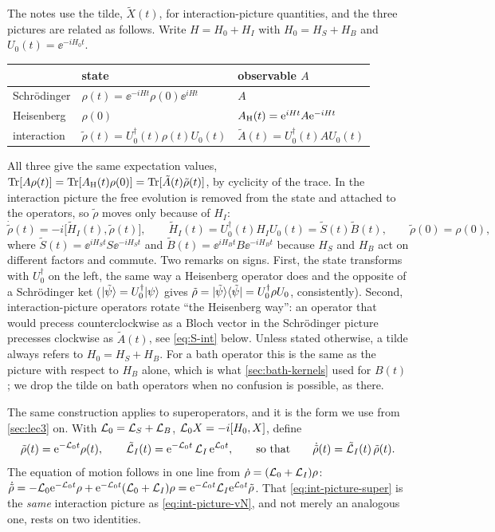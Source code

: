 The notes use the tilde, $\tilde X(t)$, for interaction-picture quantities, and the three pictures are related as follows.
Write $H=H_0+H_I$ with $H_0=H_S+H_B$ and $U_0(t)=\ee^{-iH_0t}$.
\begin{center}
\begin{tabular}{lll}
\toprule
 & state & observable $A$\\
\midrule
Schr\"odinger & $\rho(t)=\ee^{-iHt}\rho(0)\ee^{iHt}$ & $A$\\
Heisenberg & $\rho(0)$ & $A_{\rm H}(t)=\mathrm{e}^{iHt}A\mathrm{e}^{-iHt}$\\
interaction & $\tilde\rho(t)=U_0^\dagger(t)\rho(t)U_0(t)$ & $\tilde A(t)=U_0^\dagger(t)AU_0(t)$\\
\bottomrule
\end{tabular}
\end{center}
All three give the same expectation values, $\operatorname{Tr}[A\rho(t)]=\operatorname{Tr}[A_{\rm H}(t)\rho(0)]=\operatorname{Tr}[\tilde A(t)\tilde\rho(t)]$, by cyclicity of the trace.
In the interaction picture the free evolution is removed from the state and attached to the operators, so $\tilde\rho$ moves only because of $H_I$:
\begin{equation}
  \dot{\tilde\rho}(t)=-i\big[\tilde H_I(t),\tilde\rho(t)\big],\qquad
  \tilde H_I(t)=U_0^\dagger(t)H_IU_0(t)=\tilde S(t)\tilde B(t),\qquad \tilde\rho(0)=\rho(0),
  \label{eq:int-picture-vN}
\end{equation}
where $\tilde S(t)=\ee^{iH_St}S\ee^{-iH_St}$ and $\tilde B(t)=\ee^{iH_Bt}B\ee^{-iH_Bt}$ because $H_S$ and $H_B$ act on different factors and commute.
Two remarks on signs.
First, the state transforms with $U_0^\dagger$ on the left, the same way a Heisenberg operator does and the opposite of a Schr\"odinger ket ($|\tilde\psi\rangle=U_0^\dagger|\psi\rangle$ gives $\tilde\rho=|\tilde\psi\rangle\langle\tilde\psi|=U_0^\dagger\rho U_0$, consistently).
Second, interaction-picture operators rotate ``the Heisenberg way'': an operator that would precess counterclockwise as a Bloch vector in the Schr\"odinger picture precesses clockwise as $\tilde A(t)$, see \cref{eq:S-int} below.
Unless stated otherwise, a tilde always refers to $H_0=H_S+H_B$.
For a bath operator this is the same as the picture with respect to $H_B$ alone, which is what \cref{sec:bath-kernels} used for $B(t)$; we drop the tilde on bath operators when no confusion is possible, as there.

The same construction applies to superoperators, and it is the form we use from \cref{sec:lec3} on.
With $\mathcal{L}_0=\mathcal{L}_S+\mathcal{L}_B$, $\mathcal{L}_0X=-i[H_0,X]$, define
\begin{equation}
  \tilde\rho(t)=\mathrm{e}^{-\mathcal{L}_0t}\rho(t),\qquad
  \tilde{\mathcal{L}}_I(t)=\mathrm{e}^{-\mathcal{L}_0t}\,\mathcal{L}_I\,\mathrm{e}^{\mathcal{L}_0t},\qquad\text{so that}\qquad
  \dot{\tilde\rho}(t)=\tilde{\mathcal{L}}_I(t)\,\tilde\rho(t).
  \label{eq:int-picture-super}
\end{equation}
The equation of motion follows in one line from $\dot\rho=(\mathcal{L}_0+\mathcal{L}_I)\rho$: $\dot{\tilde\rho}=-\mathcal{L}_0\mathrm{e}^{-\mathcal{L}_0t}\rho+\mathrm{e}^{-\mathcal{L}_0t}(\mathcal{L}_0+\mathcal{L}_I)\rho=\mathrm{e}^{-\mathcal{L}_0t}\mathcal{L}_I\mathrm{e}^{\mathcal{L}_0t}\tilde\rho$.
That \cref{eq:int-picture-super} is the \emph{same} interaction picture as \cref{eq:int-picture-vN}, and not merely an analogous one, rests on two identities.


